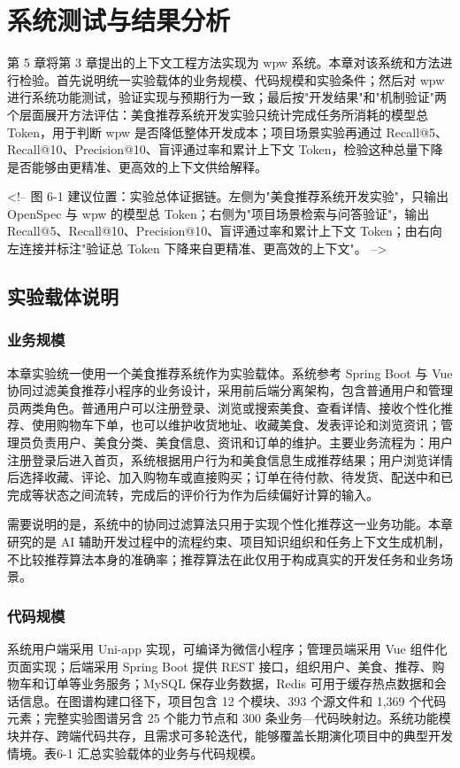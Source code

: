\chapter{系统测试与结果分析}

第 5 章将第 3 章提出的上下文工程方法实现为 wpw 系统。本章对该系统和方法进行检验。首先说明统一实验载体的业务规模、代码规模和实验条件；然后对 wpw 进行系统功能测试，验证实现与预期行为一致；最后按"开发结果"和"机制验证"两个层面展开方法评估：美食推荐系统开发实验只统计完成任务所消耗的模型总 Token，用于判断 wpw 是否降低整体开发成本；项目场景实验再通过 Recall@5、Recall@10、Precision@10、盲评通过率和累计上下文 Token，检验这种总量下降是否能够由更精准、更高效的上下文供给解释。

<!-- 图 6-1 建议位置：实验总体证据链。左侧为"美食推荐系统开发实验"，只输出 OpenSpec 与 wpw 的模型总 Token；右侧为"项目场景检索与问答验证"，输出 Recall@5、Recall@10、Precision@10、盲评通过率和累计上下文 Token；由右向左连接并标注"验证总 Token 下降来自更精准、更高效的上下文"。 -->


\section{实验载体说明}

\subsection{业务规模}
本章实验统一使用一个美食推荐系统作为实验载体。系统参考 Spring Boot 与 Vue 协同过滤美食推荐小程序的业务设计，采用前后端分离架构，包含普通用户和管理员两类角色。普通用户可以注册登录、浏览或搜索美食、查看详情、接收个性化推荐、使用购物车下单，也可以维护收货地址、收藏美食、发表评论和浏览资讯；管理员负责用户、美食分类、美食信息、资讯和订单的维护。主要业务流程为：用户注册登录后进入首页，系统根据用户行为和美食信息生成推荐结果；用户浏览详情后选择收藏、评论、加入购物车或直接购买；订单在待付款、待发货、配送中和已完成等状态之间流转，完成后的评价行为作为后续偏好计算的输入。

需要说明的是，系统中的协同过滤算法只用于实现个性化推荐这一业务功能。本章研究的是 AI 辅助开发过程中的流程约束、项目知识组织和任务上下文生成机制，不比较推荐算法本身的准确率；推荐算法在此仅用于构成真实的开发任务和业务场景。


\subsection{代码规模}
系统用户端采用 Uni-app 实现，可编译为微信小程序；管理员端采用 Vue 组件化页面实现；后端采用 Spring Boot 提供 REST 接口，组织用户、美食、推荐、购物车和订单等业务服务；MySQL 保存业务数据，Redis 可用于缓存热点数据和会话信息。在图谱构建口径下，项目包含 12 个模块、393 个源文件和 1,369 个代码元素；完整实验图谱另含 25 个能力节点和 300 条业务—代码映射边。系统功能模块并存、跨端代码共存，且需求可多轮迭代，能够覆盖长期演化项目中的典型开发情境。表6-1 汇总实验载体的业务与代码规模。

